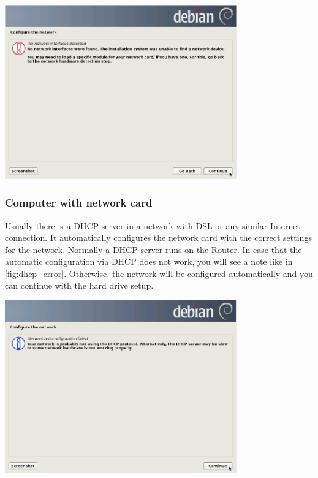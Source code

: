\documentclass[a4paper,12pt,twoside]{article}
\begin{document}
\bigskip
\begin{minipage}{\linewidth}
  \centering
  \includegraphics[width=10cm]{efaLiveen-img/efaLiveen-img6.png}
  \label{fig:inst_conf_net}
\end{minipage}


\subsubsection{Computer with network card}
\label{sct:inst_with_net}
Usually there is a DHCP server in a network with DSL or any similar
Internet connection. It automatically configures the network card with
the correct settings for the network. Normally a DHCP server runs on
the Router. In case that the automatic configuration via DHCP does not
work, you will see a note like in \ref{fig:dhcp_error}. Otherwise, the
network will be configured automatically and you can continue with the
hard drive setup.

\bigskip
\begin{minipage}{\linewidth}
    \centering
    \includegraphics[width=10cm]{efaLiveen-img/efaLiveen-img7.png}
    \label{fig:dhcp_error}
\end{minipage}
\bigskip
\end{document}
